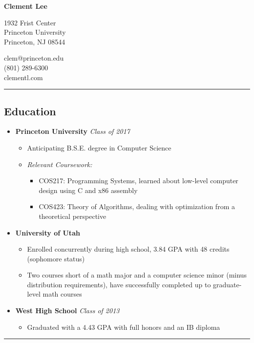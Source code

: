 \documentclass[11pt]{article}
\begin{document}
\begin{center}
{\LARGE {\textbf{Clement Lee}}}

\begin{multicols}{2}
\begin{flushright}
1932 Frist Center\\
Princeton University\\
Princeton, NJ 08544
\end{flushright}
\begin{flushleft}
clem@princeton.edu\\
(801) 289-6300\\
clementl.com
\end{flushleft}
\end{multicols}
\end{center}

\hrule
\vspace{-1em}
\subsection*{\textbf{Education}}
\begin{itemize}[nolistsep,topsep=0pt, label=]

\item \textbf{Princeton University} \emph{Class of 2017}
\begin{itemize}[nolistsep,topsep=0pt, label=]
\item Anticipating B.S.E. degree in Computer Science
\item \emph{Relevant Coursework:}
\begin{itemize}[nolistsep,topsep=0pt, label=]
\item {COS217:} Programming Systems, learned about low-level computer design using C and x86 assembly
\item {COS423:} Theory of Algorithms, dealing with optimization from a theoretical perspective
\end{itemize}
\end{itemize}

\item \textbf{University of Utah}
\begin{itemize}[nolistsep,topsep=0pt, label=]
\item Enrolled concurrently during high school, 3.84 GPA with 48 credits (sophomore status)
\item Two courses short of a math major and a computer science minor (minus distribution requirements), have successfully completed up to graduate-level math courses
\end{itemize}

\item \textbf{West High School} \emph{Class of 2013}
\begin{itemize}[nolistsep,topsep=0pt, label=]
\item Graduated with a 4.43 GPA with full honors and an IB diploma
\end{itemize}
\end{itemize}
\vspace{0.4em}
\hrule
\vspace{-1em}
\end{document}
